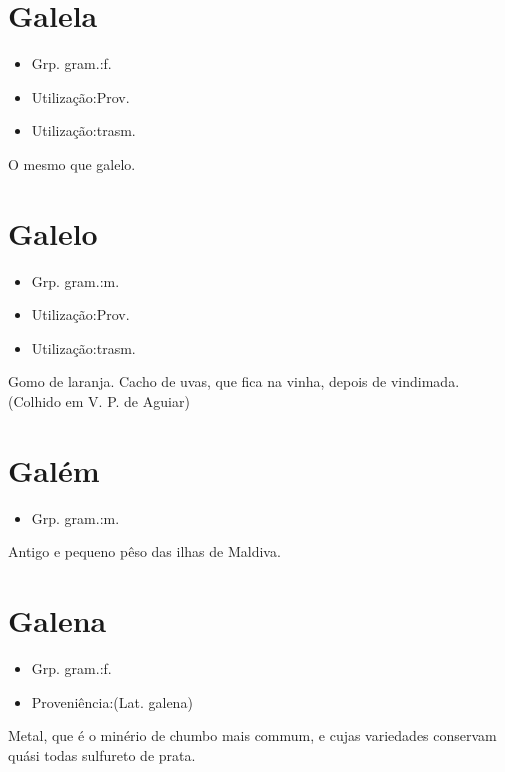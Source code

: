 \section{Galela}
\begin{itemize}
\item {Grp. gram.:f.}
\end{itemize}
\begin{itemize}
\item {Utilização:Prov.}
\end{itemize}
\begin{itemize}
\item {Utilização:trasm.}
\end{itemize}
O mesmo que \textunderscore galelo\textunderscore .
\section{Galelo}
\begin{itemize}
\item {Grp. gram.:m.}
\end{itemize}
\begin{itemize}
\item {Utilização:Prov.}
\end{itemize}
\begin{itemize}
\item {Utilização:trasm.}
\end{itemize}
Gomo de laranja.
Cacho de uvas, que fica na vinha, depois de vindimada. (Colhido em V. P. de Aguiar)
\section{Galém}
\begin{itemize}
\item {Grp. gram.:m.}
\end{itemize}
Antigo e pequeno pêso das ilhas de Maldiva.
\section{Galena}
\begin{itemize}
\item {Grp. gram.:f.}
\end{itemize}
\begin{itemize}
\item {Proveniência:(Lat. \textunderscore galena\textunderscore )}
\end{itemize}
Metal, que é o minério de chumbo mais commum, e cujas variedades conservam quási todas sulfureto de prata.
